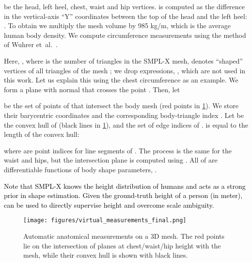 \documentclass[10pt,twocolumn,letterpaper]{article}
\newcommand{\threeD}{3D\xspace}
\newcommand{\smplx}{\mbox{SMPL-X}\xspace}
\renewcommand{\etal}{\mbox{et al.}\xspace}
\newcommand{\cameraready}[1]{\textcolor{Fuchsia}{{#1}}\xspace}
\renewcommand{\cameraready}[1]{\textcolor{black}{{#1}}\xspace}
\begin{document}
\begin{appendices}
be the
head,
left heel,
chest,
waist and
hip
vertices.
 is computed as the difference in the vertical-axis ``Y'' coordinates between
the top of the head and the left heel:
 .
To obtain  we multiply the mesh volume by 985 kg/m, which is the average human body density.
We compute circumference measurements using the method of
Wuhrer \etal~\cite{wuhrer2013estimating}.

Here, 
, where  is the number of triangles in the \smplx mesh,
denotes ``shaped'' vertices of all triangles of the mesh 
;  we drop expressions, , which are not used in this work.
Let us explain this using the chest circumference  as an example.
We form a plane  with normal 
that crosses the point .
Then, let

be the set of points of  that intersect the body mesh (red points in \cref{fig:measurements}).
We store their barycentric coordinates  and the corresponding body-triangle index .
Let  be the convex hull of  (black lines in \cref{fig:measurements}),
and 
the set of edge indices of .
 is equal to the length of the convex hull:

where  are point indices for line segments of . The process is the same for the waist and hips, but the intersection plane
is computed using .
All of  are differentiable functions of body shape parameters, .

\cameraready{Note that \smplx knows the height distribution of humans and acts as a strong prior in shape estimation. Given the ground-truth height of a person (in meter),  can be used to directly supervise height and overcome scale ambiguity.}

\begin{figure}
    \centering \texttt{[image: figures/virtual\_measurements\_final.png]}
    
    
    \vspace{-00.5 em}
    \caption{
        Automatic anatomical measurements on a \threeD mesh. 
        The red points lie on the intersection of planes at chest/waist/hip height with the mesh, 
        while their convex hull is shown with black lines.
    }
    \label{fig:measurements}
\end{figure}


\end{appendices}
\end{document}
